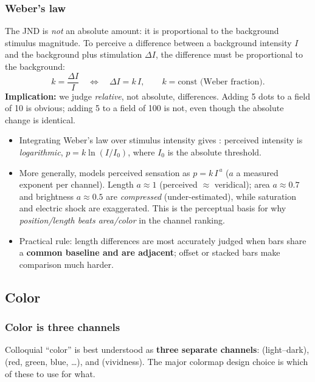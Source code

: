 \subsubsection{Weber's law}
The JND is \emph{not} an absolute amount: it is proportional to the background
stimulus magnitude. To perceive a difference between a background intensity
$I$ and the background plus stimulation $\Delta I$, the difference must be
proportional to the background:
\[
  k = \frac{\Delta I}{I} \quad\Longleftrightarrow\quad \Delta I = k\,I,
  \qquad k = \text{const (Weber fraction)}.
\]
\textbf{Implication:} we judge \emph{relative}, not absolute, differences.
Adding 5 dots to a field of 10 is obvious; adding 5 to a field of 100 is not,
even though the absolute change is identical.

\begin{keybox}
\begin{itemize}
  \item Integrating Weber's law over stimulus intensity gives : perceived intensity is \emph{logarithmic},
    $p = k\ln(I/I_0)$, where $I_0$ is the absolute threshold.
  \item More generally,  models perceived sensation
    as $p = k\,I^{\,a}$ ($a$ a measured exponent per channel). Length
    $a\!\approx\!1$ (perceived $\approx$ veridical); area $a\!\approx\!0.7$ and
    brightness $a\!\approx\!0.5$ are \emph{compressed} (under-estimated), while
    saturation and electric shock are exaggerated. This is the perceptual basis
    for why \emph{position/length beats area/color} in the channel ranking.
  \item Practical rule: length differences are most accurately judged when bars
    share a \textbf{common baseline and are adjacent}; offset or stacked bars
    make comparison much harder.
\end{itemize}
\end{keybox}

\subsection{Color}

\subsubsection{Color is three channels}
Colloquial ``color'' is best understood as \textbf{three separate channels}:
 (light--dark),  (red, green, blue, \ldots), and
 (vividness). The major colormap design choice is which of
these to use for what.


